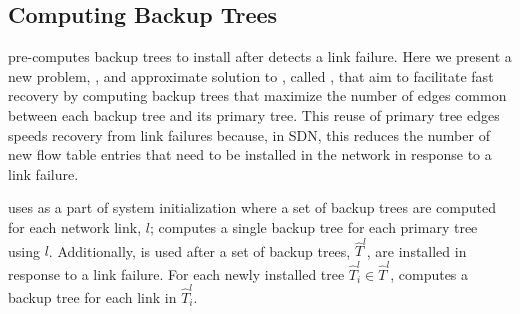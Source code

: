 \subsection{Computing Backup Trees}
\label{subsec:min-control}

\mdr pre-computes backup trees to install after \pcnt detects a link failure.  Here we present a new problem, \mcs, and approximate solution to \mcs, called \steiners, that aim to facilitate fast
recovery by computing backup trees that maximize the number of edges common between each backup tree and its primary tree.  This reuse of primary tree edges speeds recovery from link
failures because, in SDN, this reduces the number of new flow table entries that need to be installed in the network in response to a link failure.

\mdr uses \steiner as a part of system initialization where a set of backup trees are computed for each network link, $l$; \mdr computes a single backup tree for each primary tree using $l$. 
Additionally, \steiner is used after a set of backup trees, $\hat{T}^l$, are installed in response to a link failure.  For each newly installed tree $\hat{T}^l_i \in \hat{T}^l$, \mdr computes 
a backup tree for each link in $\hat{T}^l_i$.



